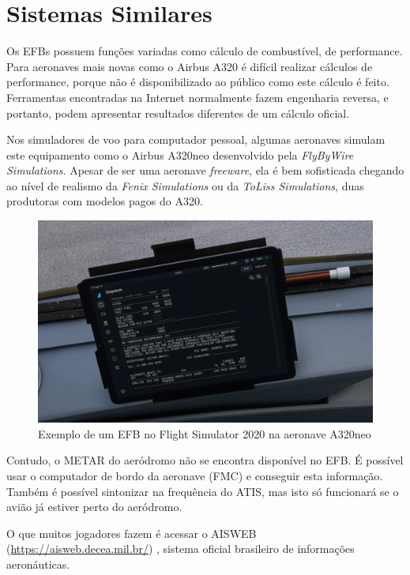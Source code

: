 \chapter{Sistemas Similares}
Os EFBs possuem funções variadas como cálculo de combustível, de performance.
Para aeronaves mais novas como o Airbus A320 é difícil realizar cálculos
de performance, porque não é disponibilizado ao público como este cálculo é
feito. Ferramentas encontradas na Internet \cite{a320-perf} normalmente fazem engenharia
reversa, e portanto, podem apresentar resultados diferentes de um cálculo
oficial.

Nos simuladores de voo para computador pessoal, algumas aeronaves
simulam este equipamento como o Airbus A320neo desenvolvido pela
\textit{FlyByWire Simulations}. Apesar de ser uma aeronave \textit{freeware}, ela 
é bem sofisticada chegando ao nível de realismo da \textit{Fenix Simulations}
ou da \textit{ToLiss Simulations}, duas produtoras com modelos pagos do A320.

\begin{figure}[ht]
    \begin{center}
    \includegraphics[width=400pt]{img/efb-a320.png}
    \caption{Exemplo de um EFB no Flight Simulator 2020 na aeronave A320neo}
    \label{fig:efb-a320}
    \end{center}
\end{figure}

Contudo, o METAR do aeródromo não se encontra disponível no EFB.
É possível usar o computador de bordo da aeronave (FMC) e conseguir
esta informação. Também é possível sintonizar na frequência do ATIS,
mas isto só funcionará se o avião já estiver perto do aeródromo.

O que muitos jogadores fazem é acessar o AISWEB (\url{https://aisweb.decea.mil.br/}) , sistema oficial brasileiro
de informações aeronáuticas. 


